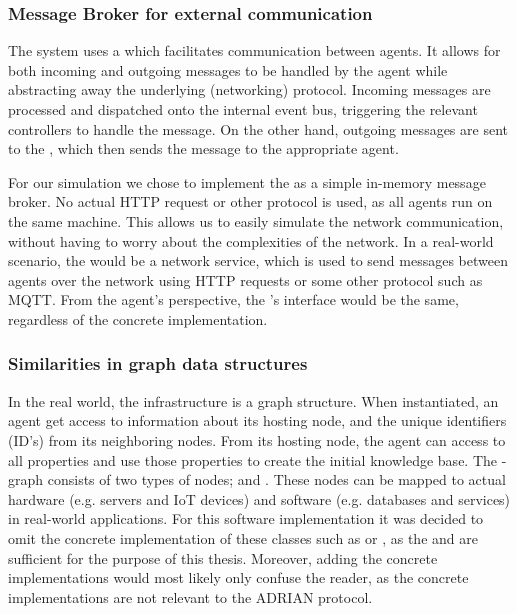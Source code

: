 \subsubsection{Message Broker for external communication}
\label{sssec:message-broker}
The system uses a  which facilitates communication between agents. It allows for both incoming and outgoing messages to be handled by the agent while abstracting away the underlying (networking) protocol. Incoming messages are processed and dispatched onto the internal event bus, triggering the relevant controllers to handle the message. On the other hand, outgoing messages are sent to the , which then sends the message to the appropriate agent.

For our simulation we chose to implement the  as a simple in-memory message broker. No actual HTTP request or other protocol is used, as all agents run on the same machine. This allows us to easily simulate the network communication, without having to worry about the complexities of the network. In a real-world scenario, the  would be a network service, which is used to send messages between agents over the network using HTTP requests or some other protocol such as MQTT. From the agent's perspective, the 's interface would be the same, regardless of the concrete implementation.


\subsubsection{Similarities in graph data structures}
\label{sssec:graph-data-structures}
In the real world, the infrastructure is a graph structure. When instantiated, an agent get access to information about its hosting node, and the unique identifiers (ID's) from its neighboring nodes. From its hosting node, the agent can access to all properties and use those properties to create the initial knowledge base. The -graph consists of two types of nodes;  and . These nodes can be mapped to actual hardware (e.g. servers and IoT devices) and software (e.g. databases and services) in real-world applications. For this software implementation it was decided to omit the concrete implementation of these classes such as  or , as the  and  are sufficient for the purpose of this thesis. Moreover, adding the concrete implementations would most likely only confuse the reader, as the concrete implementations are not relevant to the ADRIAN protocol.

